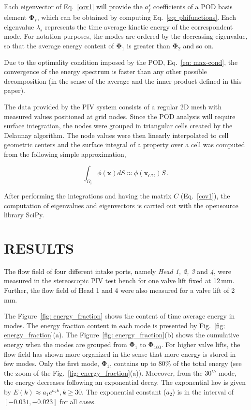 \documentclass[10pt,fleqn,a4paper]{article}
\newcommand{\bv}[1]{\mathbf{#1}}
\begin{document}
Each eigenvector of Eq.~\eqref{cov1} will provide the $a^{s}_{j}$ coefficients of a POD basis element $\bv{\Phi}_s$, which can be obtained by computing Eq.~\eqref{eq: phifunctions}. Each eigenvalue $\lambda_s$ represents the time average kinetic energy of the correspondent mode. For notation purposes, the modes are ordered by the decreasing eigenvalue, so that the average energy content of $\bv{\Phi}_1$ is greater than $\bv{\Phi}_2$ and so on.

Due to the optimality condition imposed by the POD, Eq.~\eqref{eq: max-cond}, the convergence of the energy spectrum is faster than any other possible decomposition (in the sense of the average and the inner product defined in this paper).

The data provided by the PIV system consists of a regular 2D mesh with measured values positioned at grid nodes. Since the POD analysis will require surface integration, the nodes were grouped in triangular cells created by the Delaunay algorithm. The node values were then linearly interpolated to cell geometric centers and the surface integral of a property over a cell was computed from the following simple approximation,

\begin{equation}
 \int_{\Omega_i} \phi (\bv{x}) dS \approx \phi (\bv{x}_{CG}) S \,.
\end{equation}

After performing the integrations and having the matrix $C$ (Eq.~\eqref{cov1}), the computation of eigenvalues and eigenvectors is carried out with the opensource library SciPy.

\section{RESULTS}

The flow field of four different intake ports, namely \textit{Head 1, 2, 3} and \textit{4}, were measured in the stereoscopic PIV test bench for one valve lift fixed at 12\,mm.  Further, the flow field of Head 1 and 4 were also measured for a valve lift of 2\,mm.

The Figure~\ref{fig: energy_fraction} shows the content of time average energy in modes. The energy fraction content in each mode is presented by Fig.~\ref{fig: energy_fraction}(a). The Figure~\ref{fig: energy_fraction}(b) shows the cumulative energy when the modes are grouped from $\bv{\Phi}_1$ to $\bv{\Phi}_{100}$. For higher valve lifts, the flow field has shown more organized in the sense that more energy is stored in few modes. Only the first mode, $\bv{\Phi}_1$, contains up to 80$\%$ of the total energy (see the zoom of the Fig.~\ref{fig: energy_fraction}(a)). Moreover, from the 30$^{th}$ mode, the energy decreases following an exponential decay. The exponential law is given by $E(k) \approx a_1 e^{a_2 k} ,  k \ge 30$. The exponential constant ($a_2$) is in the interval of $[-0.031,-0.023]$ for all cases.
\end{document}

